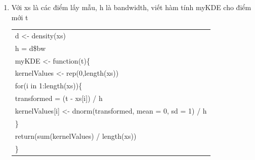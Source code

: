 \documentclass[a4paper, 13pt]{report}
\begin{document}
\begin{enumerate}[label=\textbf{PL\arabic*}]
\item \label{calculateNewPoint} Với xs là các điểm lấy mẫu, h là bandwidth, viết hàm tính myKDE cho điểm mới t\\
\begin{tabular}{ |l| } 
 \hline
d <- density(xs)\\
h = d\$bw\\
myKDE <- function(t)\{\\
\hspace{1cm}kernelValues <- rep(0,length(xs))\\
\hspace{1cm}for(i in 1:length(xs))\{\\
\hspace{2cm}transformed = (t - xs[i]) / h\\
\hspace{2cm}kernelValues[i] <- dnorm(transformed, mean = 0, sd = 1) / h\\
\hspace{1cm}\}\\
\hspace{1cm}return(sum(kernelValues) / length(xs))\\
\}\\
\hline
\end{tabular}


\end{enumerate}
\end{document}
